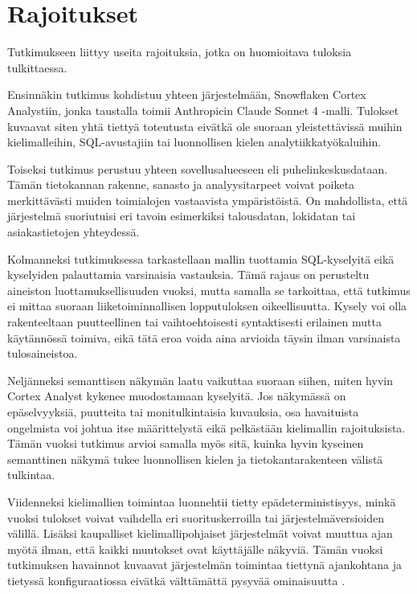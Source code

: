 \section{Rajoitukset}\label{sec:limitations}
Tutkimukseen liittyy useita rajoituksia, jotka on huomioitava tuloksia tulkittaessa.

Ensinnäkin tutkimus kohdistuu yhteen järjestelmään, Snowflaken Cortex Analystiin, jonka taustalla toimii Anthropicin Claude Sonnet 4 -malli. Tulokset kuvaavat siten yhtä tiettyä toteutusta eivätkä ole suoraan yleistettävissä muihin kielimalleihin, SQL-avustajiin tai luonnollisen kielen analytiikkatyökaluihin.

Toiseksi tutkimus perustuu yhteen sovellusalueeseen eli puhelinkeskusdataan. Tämän tietokannan rakenne, sanasto ja analyysitarpeet voivat poiketa merkittävästi muiden toimialojen vastaavista ympäristöistä. On mahdollista, että järjestelmä suoriutuisi eri tavoin esimerkiksi talousdatan, lokidatan tai asiakastietojen yhteydessä.

Kolmanneksi tutkimuksessa tarkastellaan mallin tuottamia SQL-kyselyitä eikä kyselyiden palauttamia varsinaisia vastauksia. Tämä rajaus on perusteltu aineiston luottamuksellisuuden vuoksi, mutta samalla se tarkoittaa, että tutkimus ei mittaa suoraan liiketoiminnallisen lopputuloksen oikeellisuutta. Kysely voi olla rakenteeltaan puutteellinen tai vaihtoehtoisesti syntaktisesti erilainen mutta käytännössä toimiva, eikä tätä eroa voida aina arvioida täysin ilman varsinaista tulosaineistoa.

Neljänneksi semanttisen näkymän laatu vaikuttaa suoraan siihen, miten hyvin Cortex Analyst kykenee muodostamaan kyselyitä. Jos näkymässä on epäselvyyksiä, puutteita tai monitulkintaisia kuvauksia, osa havaituista ongelmista voi johtua itse määrittelystä eikä pelkästään kielimallin rajoituksista. Tämän vuoksi tutkimus arvioi samalla myös sitä, kuinka hyvin kyseinen semanttinen näkymä tukee luonnollisen kielen ja tietokantarakenteen välistä tulkintaa.

Viidenneksi kielimallien toimintaa luonnehtii tietty epädeterministisyys, minkä vuoksi tulokset voivat vaihdella eri suorituskerroilla tai järjestelmäversioiden välillä. Lisäksi kaupalliset kielimallipohjaiset järjestelmät voivat muuttua ajan myötä ilman, että kaikki muutokset ovat käyttäjälle näkyviä. Tämän vuoksi tutkimuksen havainnot kuvaavat järjestelmän toimintaa tiettynä ajankohtana ja tietyssä konfiguraatiossa eivätkä välttämättä pysyvää ominaisuutta \cite{chen2024chatgpt}.

